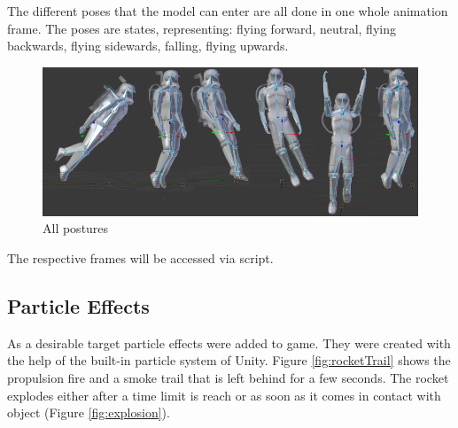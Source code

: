 \documentclass[12pt, letterpaper]{scrartcl}
\begin{document}
	The different poses that the model can enter are all done in one whole animation frame. The poses are states, representing: flying forward, neutral, flying backwards, flying sidewards, falling, flying upwards.
	\begin{figure}[H]
		\centering
		\includegraphics[scale=.7]{images//alpha/allAnimations}
		\caption{All postures}
	\end{figure}
	The respective frames will be accessed via script.
	
	\subsection{Particle Effects}
	As a desirable target particle effects were added to game. They were created with the help of the built-in particle system of Unity. Figure \ref{fig:rocketTrail} shows the propulsion fire and a smoke trail that is left behind for a few seconds. The rocket explodes either after a time limit is reach or as soon as it comes in contact with object (Figure \ref{fig:explosion}). 
	
\end{document}
